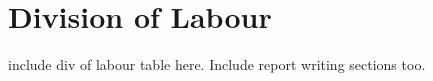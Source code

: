 

\chapter{Division of Labour}

include div of labour table here. 
Include report writing sections too.
